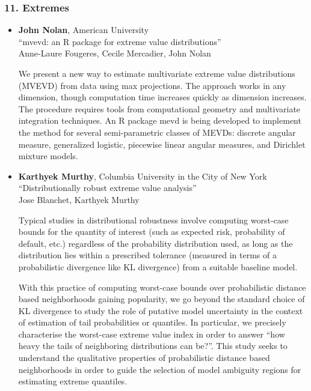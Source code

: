 \subsubsection*{11. Extremes}

\begin{itemize}
\item \textbf{John Nolan}, American University \\
``mvevd: an R package for extreme value distributions'' \\
Anne-Laure Fougeres, Cecile Mercadier, John Nolan


We present a new way to estimate multivariate extreme value distributions (MVEVD) from data using max projections.
The approach works in any dimension, though computation time increases quickly as dimension increases.
The procedure requires tools from computational geometry and multivariate integration techniques.
An R package mevd is being developed to implement the method for several semi-parametric classes of MEVDs:
discrete angular measure, generalized logistic, piecewise linear angular measures, and Dirichlet mixture models.

\item \textbf{Karthyek Murthy}, Columbia University in the City of New York \\
``Distributionally robust extreme value analysis'' \\
Jose Blanchet, Karthyek Murthy


Typical studies in distributional robustness involve computing worst-case bounds for the quantity of interest (such as expected risk, probability of default, etc.) regardless of the probability distribution used, as long as the distribution lies within a prescribed tolerance (measured in terms of a probabilistic divergence like KL divergence) from a suitable baseline model. 

With this practice of computing worst-case bounds over probabilistic distance based neighborhoods gaining popularity, we go beyond the standard choice of KL divergence to study the role of putative model uncertainty in the context of estimation of tail probabilities or quantiles. In particular, we precisely   characterise  the worst-case extreme value index in order to answer “how heavy the tails of neighboring distributions can be?”. This study seeks to understand the qualitative properties of probabilistic distance based neighborhoods in order to guide the selection of model ambiguity regions for estimating extreme quantiles.  


\end{itemize}
